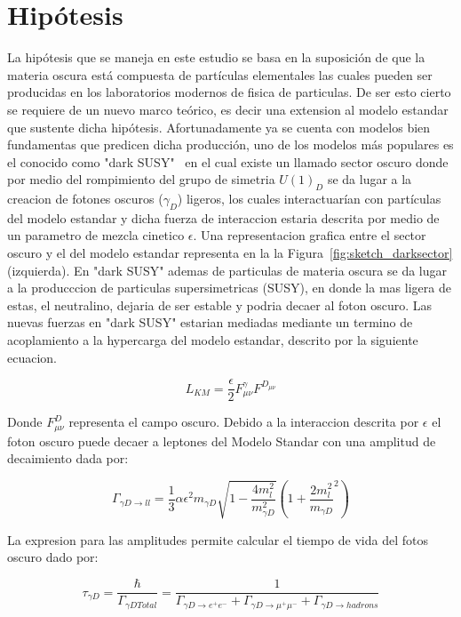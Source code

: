 \chapter{Hipótesis}

La hipótesis que se maneja en este estudio se basa en la suposici\'on de que la materia oscura está compuesta de partículas elementales las cuales pueden ser producidas
en los laboratorios modernos de fisica de particulas.
De ser esto cierto se requiere de un nuevo marco teórico, es decir una extension al modelo estandar que sustente dicha hipótesis. Afortunadamente ya se cuenta con modelos bien fundamentas que predicen dicha producción, uno de los modelos más populares es el conocido como "dark SUSY"~\cite{} en el cual existe un llamado sector oscuro donde por
medio del rompimiento del grupo de simetria $U(1)_{D}$ se da lugar a la creacion de fotones oscuros ($\gamma_{D}$) ligeros, los cuales interactuarían con partículas
del modelo estandar y dicha fuerza de interaccion estaria descrita por medio de un parametro de mezcla cinetico $\epsilon$.  Una representacion grafica entre el sector oscuro y el del modelo estandar representa
en la la Figura~\ref{fig:sketch_darksector} (izquierda). En "dark SUSY" ademas de particulas de materia oscura se da lugar a la producccion de particulas supersimetricas (SUSY), en donde la mas ligera de estas, el neutralino, dejaria de ser estable y podria decaer al foton oscuro. Las nuevas fuerzas en "dark SUSY" estarian mediadas mediante
un termino de acoplamiento a la hypercarga del modelo estandar, descrito por la siguiente ecuacion.  

\begin{equation} 
L_{KM} = \frac{\epsilon}{2} F_{\mu\nu}^{\gamma}F^{D_{\mu\nu}}
\end{equation}

Donde $F_{\mu\nu}^{D}$ representa el campo oscuro.  Debido a la interaccion descrita por $\epsilon$ el foton oscuro puede decaer a leptones del Modelo Standar
con una amplitud de decaimiento dada por:

\begin{equation}
  \Gamma_{\gamma D \rightarrow ll} = \frac{1}{3}\alpha \epsilon^{2} m_{\gamma D} \sqrt{1-\frac{4 m_{l}^{2}}{m_{\gamma D}^2}}(1+\frac{2m_{l}^{2}}{m_{\gamma D}}^{2})
\end{equation}

La expresion para las amplitudes permite calcular el tiempo de vida del fotos oscuro dado por: 

\begin{equation}
  \tau_{\gamma D}= \frac{\hbar}{\Gamma_{\gamma D Total}}=\frac{1}{\Gamma_{\gamma D \rightarrow e^{+}e^{-}}  + \Gamma_{\gamma D \rightarrow \mu^{+}\mu^{-}} + \Gamma_{\gamma D \rightarrow hadrons}}
\end{equation}

